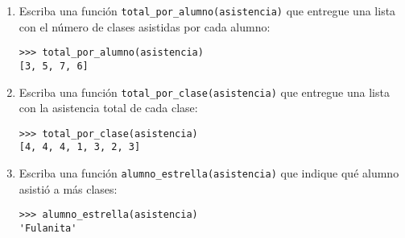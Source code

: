\documentclass[10pt,spanish]{article}
\begin{document}
\begin{enumerate}
      \begin{enumerate}
        \item
          Escriba una función \lstinline+total_por_alumno(asistencia)+
          que entregue una lista
          con el número de clases asistidas por cada alumno:
          \begin{lstlisting}
>>> total_por_alumno(asistencia)
[3, 5, 7, 6]
          \end{lstlisting}
        \item
          Escriba una función \lstinline+total_por_clase(asistencia)+
          que entregue una lista
          con la asistencia total de cada clase:
          \begin{lstlisting}
>>> total_por_clase(asistencia)
[4, 4, 4, 1, 3, 2, 3]
          \end{lstlisting}
        \item
          Escriba una función \lstinline+alumno_estrella(asistencia)+
          que indique qué alumno asistió a más clases:
          \begin{lstlisting}
>>> alumno_estrella(asistencia)
'Fulanita'
          \end{lstlisting}
      \end{enumerate}
      \framebox[\textwidth]{\rule[50.0ex]{0pt}{0pt}}

  \end{enumerate}
\end{document}

